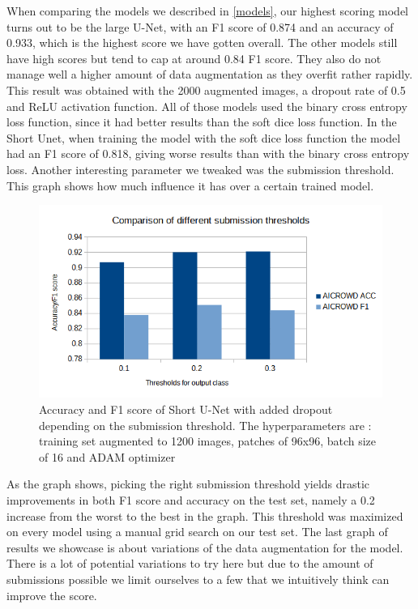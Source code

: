 \documentclass[10pt,conference,compsocconf]{IEEEtran}
\begin{document}
When comparing the models we described in \ref{models}, our highest scoring model turns out to be the large U-Net, with an F1 score of 0.874 and an accuracy of 0.933, which is the highest score we have gotten overall. The other models still have high scores but tend to cap at around 0.84 F1 score. They also do not manage well a higher amount of data augmentation as they overfit rather rapidly. This result was obtained with the 2000 augmented images, a dropout rate of 0.5 and ReLU activation function.
\newline
All of those models used the binary cross entropy loss function, since it had better results than the soft dice loss function. In the Short Unet, when training the model with the soft dice loss function the model had an F1 score of 0.818, giving worse results than with the binary cross entropy loss.
\newline
Another interesting parameter we tweaked was the submission threshold. This graph shows how much influence it has over a certain trained model.
\begin{figure}[H]
    \centering
    \includegraphics[scale = 0.4]{report_images/thresholds_graph.png} %
    \caption{Accuracy and F1 score of Short U-Net with added dropout depending on the submission threshold. The hyperparameters are : training set augmented to 1200 images, patches of 96x96, batch size of 16 and ADAM optimizer}
\end{figure}
As the graph shows, picking the right submission threshold yields drastic improvements in both F1 score and accuracy on the test set, namely a 0.2 increase from the worst to the best in the graph. This threshold was maximized on every model using a manual grid search on our test set.
\newline
\label{results_data}
The last graph of results we showcase is about variations of the data augmentation for the model. There is a lot of potential variations to try here but due to the amount of submissions possible we limit ourselves to a few that we intuitively think can improve the score.
\end{document}
